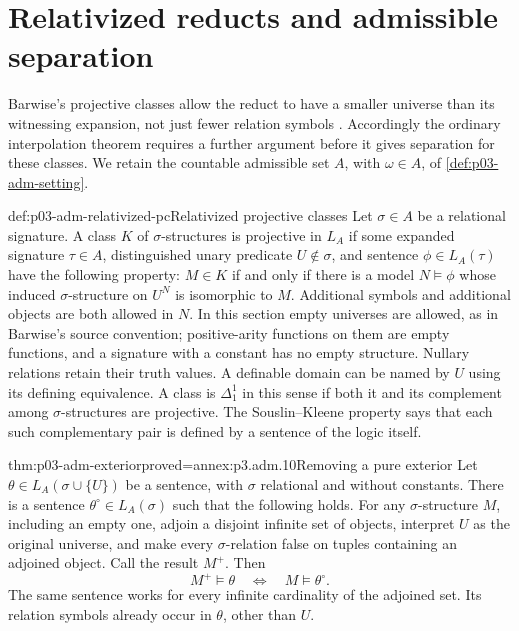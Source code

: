 \section{Relativized reducts and admissible separation}
\label{sec:p03-relativized-admissible-separation}

Barwise's projective classes allow the reduct to have a smaller universe
than its witnessing expansion, not just fewer relation symbols
\cite[Part~II, Definition~1.1, pp.~248--249]{Barwise1974Axioms}.
Accordingly the ordinary interpolation theorem requires a further
argument before it gives separation for these classes. We retain the
countable admissible set \(A\), with \(\omega\in A\), of
\cref{def:p03-adm-setting}.

\begin{hbdefinition}{def:p03-adm-relativized-pc}{Relativized projective classes}
Let \(\sigma\in A\) be a relational signature. A class \(K\) of
\(\sigma\)-structures is projective in \(L_A\) if some expanded
signature \(\tau\in A\), distinguished unary predicate \(U\notin\sigma\),
and sentence \(\phi\in L_A(\tau)\) have the following property:
\(M\in K\) if and only if there is a model \(N\models\phi\)
whose induced \(\sigma\)-structure on \(U^N\)
is isomorphic to \(M\). Additional symbols and additional objects are
both allowed in \(N\). In this section empty universes are allowed,
as in Barwise's source convention; positive-arity functions on them
are empty functions, and a signature with a constant has no empty
structure. Nullary relations retain their truth values. A definable
domain can be named by \(U\) using
its defining equivalence. A class is \(\Delta^1_1\) in this sense if
both it and its complement among \(\sigma\)-structures are projective.
The Souslin--Kleene property says that each such complementary pair is
defined by a sentence of the logic itself.
\end{hbdefinition}

\begin{hblemma}{thm:p03-adm-exterior}{proved=annex:p3.adm.10}{Removing a pure exterior}
Let \(\theta\in L_A(\sigma\cup\{U\})\) be a sentence, with \(\sigma\)
relational and without constants. There is a sentence
\(\theta^\circ\in L_A(\sigma)\) such that the following holds.
For any \(\sigma\)-structure \(M\), including an empty one, adjoin a disjoint infinite set
of objects, interpret \(U\) as the original universe, and make every
\(\sigma\)-relation false on tuples containing an adjoined object.
Call the result \(M^+\). Then
\[
 M^+\models\theta\quad\Longleftrightarrow\quad M\models\theta^\circ.
\]
The same sentence works for every infinite cardinality of the adjoined
set. Its relation symbols already occur in \(\theta\), other than \(U\).
\end{hblemma}

